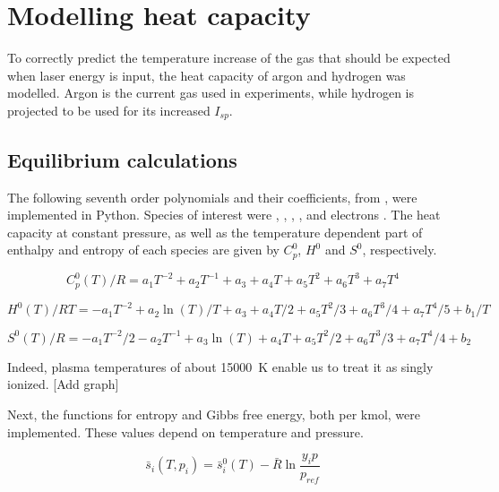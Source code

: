 \chapter{Modelling heat capacity} \label{chp:models}
    
    To correctly predict the temperature increase of the gas that should be expected when laser energy is input, the heat capacity of argon and hydrogen was modelled. Argon is the current gas used in experiments, while hydrogen is projected to be used for its increased $I_{sp}$.

    \section{Equilibrium calculations} \label{sec:equilibrium calcs}
        
        The following seventh order polynomials and their coefficients, from \textcite{mcbrideNASAGlennCoefficients2002}, were implemented in Python. Species of interest were , , , ,  and electrons . The heat capacity at constant pressure, as well as the temperature dependent part of enthalpy and entropy of each species are given by $C_p^0$, $H^0$ and $S^0$, respectively.

        \begin{equation}
            C_p^0 (T)/R = a_1 T^{-2} + a_2 T^{-1} + a_3 + a_4   T + a_5 T^2 + a_6 T^3 + a_7 T^4
        \end{equation} 
        
        \begin{equation}
            H^0 (T)/RT = -a_1 T^{-2} + a_2 \ln(T)/T + a_3 + a_4 T / 2 + a_5 {T^2}/3 + a_6 {T^3}/4 + a_7 {T^4}/5 + b_1/T
        \end{equation}
        
        \begin{equation}
            S^0(T)/R = -a_1 T^{-2}/2 - a_2 T^{-1} + a_3\ln(T) + a_4   T + a_5 {T^2}/2 + a_6 T^3/3 + a_7 T^4/4 + b_2
        \end{equation}

        Indeed, plasma temperatures of about \qty{15000}{K} enable us to treat it as singly ionized. [Add graph]

        Next, the functions for entropy and Gibbs free energy, both per \unit{kmol}, were implemented. These values depend on temperature and pressure. 
        
        \begin{equation}
            \bar s_i (T, p_i) = \bar s_i^0 (T) - \bar R \ln \frac{y_i p}{p_{ref}}
        \end{equation}

